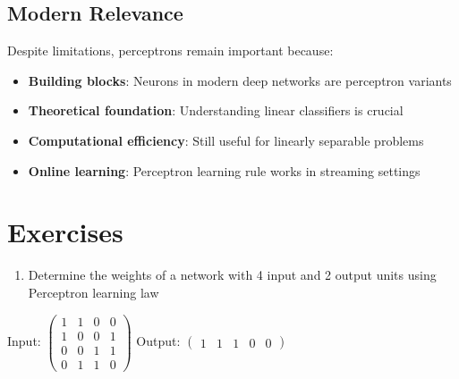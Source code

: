 \subsection{Modern Relevance}
Despite limitations, perceptrons remain important because:
\begin{itemize}
    \item \textbf{Building blocks}: Neurons in modern deep networks are perceptron variants
    \item \textbf{Theoretical foundation}: Understanding linear classifiers is crucial
    \item \textbf{Computational efficiency}: Still useful for linearly separable problems
    \item \textbf{Online learning}: Perceptron learning rule works in streaming settings
\end{itemize}

\section{Exercises} 
 
\begin{enumerate}
    \item Determine the weights of a network with 4 input and 2 output units using Perceptron learning law
\end{enumerate}
Input:
\(\begin{pmatrix} 1 & 1 & 0 & 0 \\ 1 & 0 & 0 & 1 \\ 0 & 0 & 1 & 1 \\ 0 & 1 & 1 & 0 \end{pmatrix}\)
Output:
\( \begin{pmatrix} 1& 1 & 1 & 0 & 0 \end{pmatrix} \)
